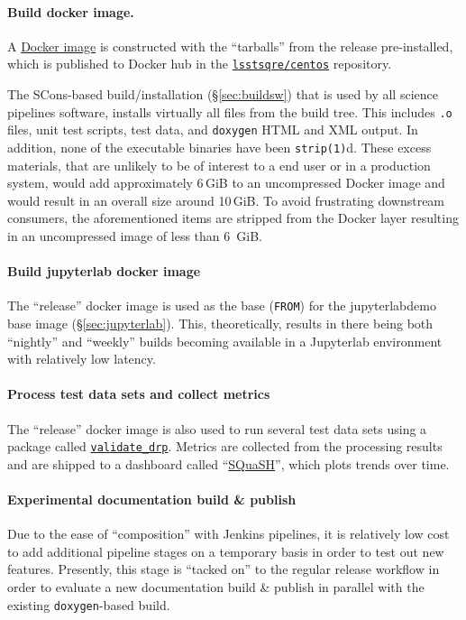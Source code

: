 \paragraph{Build docker image.}

A \href{https://github.com/lsst-sqre/docker-tarballs}{Docker image} is
constructed with the ``tarballs'' from the release pre-installed, which is
published to Docker hub in the
\href{https://hub.docker.com/r/lsstsqre/centos/}{\texttt{lsstsqre/centos}} repository.

The SCons-based build/installation (\S\ref{sec:buildsw}) that is used by all science pipelines software, installs
virtually all files from the build tree. This includes \texttt{.o} files, unit
test scripts, test data, and \texttt{doxygen} HTML and XML output. In
addition, none of the executable binaries have been \texttt{strip(1)}d.  These
excess materials, that are unlikely to be of interest to a end user or in a
production system, would add approximately 6\,GiB to an uncompressed Docker image and
would result in an overall size around 10\,GiB.  To avoid frustrating downstream
consumers, the aforementioned items are stripped from the Docker layer resulting in an uncompressed image of less than 6~GiB.

\paragraph{Build jupyterlab docker image}

The ``release'' docker image is used as the base (\texttt{FROM}) for the
jupyterlabdemo base image (\S\ref{sec:jupyterlab}).  This, theoretically, results in there being both
``nightly'' and ``weekly'' builds becoming available in a Jupyterlab environment
with relatively low latency.

\paragraph{Process test data sets and collect metrics}

The ``release'' docker image is also used to run several test data sets using a
package called
\href{https://github.com/lsst/validate_drp/}{\texttt{validate\_drp}}.
Metrics are collected from the processing results and are shipped to a
dashboard called ``\href{https://squash.lsst.codes/}{SQuaSH}''\cite{SQR-009}, which plots
trends over time.

\paragraph{Experimental documentation build \& publish}

Due to the ease of ``composition'' with Jenkins pipelines, it is relatively low
cost to add additional pipeline stages on a temporary basis in order to test out
new features.  Presently, this stage is ``tacked on'' to the regular release
workflow in order to evaluate a new documentation build \& publish in parallel
with the existing \texttt{doxygen}-based build.

